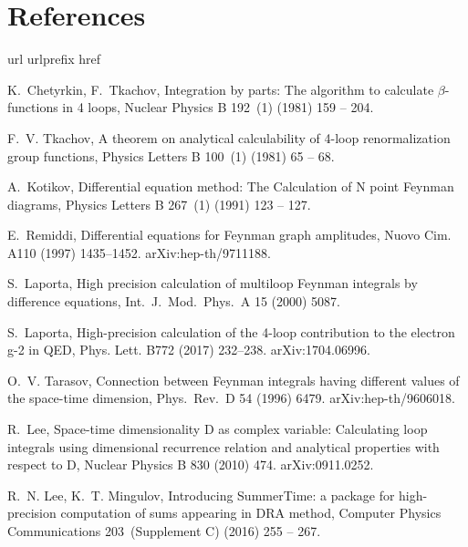 \documentclass[sort&compress]{elsarticle}
\begin{document}
\section*{References}

%
\begin{thebibliography}{10}
	\expandafter\ifx\csname url\endcsname\relax
	\def\url#1{\texttt{#1}}\fi
	\expandafter\ifx\csname urlprefix\endcsname\relax\def\urlprefix{URL }\fi
	\expandafter\ifx\csname href\endcsname\relax
	\def\href#1#2{#2} \def\path#1{#1}\fi
	
	K.~Chetyrkin, F.~Tkachov, Integration by parts: {T}he algorithm to calculate
	$\beta$-functions in 4 loops, Nuclear Physics B 192~(1) (1981) 159 -- 204.
	
	F.~V. Tkachov, A theorem on analytical calculability of 4-loop renormalization
	group functions, Physics Letters B 100~(1) (1981) 65 -- 68.
	
	A.~Kotikov, Differential equation method: {T}he {C}alculation of {N} point
	{F}eynman diagrams, Physics Letters B 267~(1) (1991) 123 -- 127.
	
	E.~Remiddi, Differential equations for {F}eynman graph amplitudes, Nuovo {C}im.
	A110 (1997) 1435--1452.
	\newblock \href {http://arxiv.org/abs/hep-th/9711188}
	{\path{arXiv:hep-th/9711188}}.
	
	S.~Laporta, {High precision calculation of multiloop Feynman integrals by
		difference equations}, Int.~J.~Mod.~Phys.~A 15 (2000) 5087.
	
	S.~Laporta, {High-precision calculation of the 4-loop contribution to the
		electron g-2 in QED}, Phys. Lett. B772 (2017) 232--238.
	\newblock \href {http://arxiv.org/abs/1704.06996} {\path{arXiv:1704.06996}}.
	
	O.~V. Tarasov, {Connection between Feynman integrals having different values of
		the space-time dimension}, Phys.~Rev.~D 54 (1996) 6479.
	\newblock \href {http://arxiv.org/abs/hep-th/9606018}
	{\path{arXiv:hep-th/9606018}}.
	
	R.~Lee, {Space-time dimensionality D as complex variable: Calculating loop
		integrals using dimensional recurrence relation and analytical properties
		with respect to D}, Nuclear Physics B 830 (2010) 474.
	\newblock \href {http://arxiv.org/abs/0911.0252} {\path{arXiv:0911.0252}}.
	
	R.~N. Lee, K.~T. Mingulov, {Introducing SummerTime: a package for
		high-precision computation of sums appearing in DRA method}, Computer Physics
	Communications 203~(Supplement C) (2016) 255 -- 267.
	

\end{thebibliography}
\end{document}

